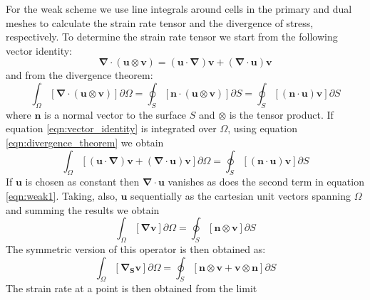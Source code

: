 For the weak scheme we use line integrals around cells in the primary and dual meshes to calculate the strain rate tensor and the divergence of stress, respectively. To determine the strain rate tensor we start from the following vector identity:
\begin{equation}
\boldsymbol{\nabla} \cdot (\boldsymbol{u} \otimes \boldsymbol{v}) = (\boldsymbol{u} \cdot \boldsymbol{\nabla}) \boldsymbol{v} + (\boldsymbol{\nabla} \cdot \boldsymbol{u}) \boldsymbol{v}
\label{eqn:vector_identity}
\end{equation}
and from the divergence theorem:
\begin{equation}
\int_\Omega \left[ \boldsymbol{\nabla} \cdot (\boldsymbol{u} \otimes \boldsymbol{v}) \right] \partial{\Omega} = \oint_S \left[\boldsymbol{n} \cdot (\boldsymbol{u} \otimes \boldsymbol{v}) \right] \partial{S} = \oint_S \left[(\boldsymbol{n} \cdot \boldsymbol{u}) \boldsymbol{v} \right] \partial{S}
\label{eqn:divergence_theorem}
\end{equation}
where $\boldsymbol{n}$ is a normal vector to the surface $S$ and $\otimes$ is the tensor product.
If equation \ref{eqn:vector_identity} is integrated over $\Omega$, using equation \ref{eqn:divergence_theorem} we obtain
\begin{equation}
\int_\Omega \left[ (\boldsymbol{u} \cdot \boldsymbol{\nabla}) \boldsymbol{v} + (\boldsymbol{\nabla} \cdot \boldsymbol{u}) \boldsymbol{v} \right] \partial{\Omega} = \oint_S \left[(\boldsymbol{n} \cdot \boldsymbol{u}) \boldsymbol{v} \right] \partial{S}
\label{eqn:weak1}
\end{equation}
If $\boldsymbol{u}$ is chosen as constant then $\boldsymbol{\nabla} \cdot \boldsymbol{u}$ vanishes as does the second term in equation \ref{eqn:weak1}. Taking, also, $\boldsymbol{u}$ sequentially as the cartesian unit vectors spanning $\Omega$ and summing the results we obtain
\begin{equation}
\int_\Omega \left[ \boldsymbol{\nabla} \boldsymbol{v} \right] \partial{\Omega} = \oint_S \left[ \boldsymbol{n} \otimes \boldsymbol{v} \right] \partial{S}
\end{equation}
The symmetric version of this operator is then obtained as:
\begin{equation}
\int_\Omega \left[ \boldsymbol{\nabla_S} \boldsymbol{v} \right] \partial{\Omega} = \oint_S \left[ \boldsymbol{n} \otimes \boldsymbol{v} + \boldsymbol{v} \otimes \boldsymbol{n} \right] \partial{S}
\end{equation}
The strain rate at a point is then obtained from the limit
